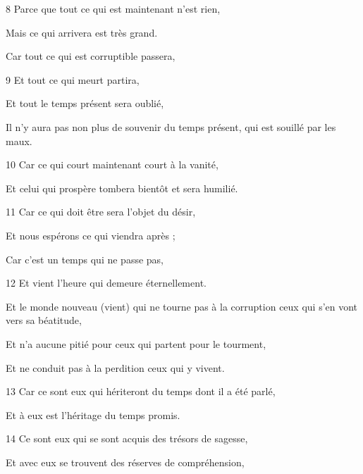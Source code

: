 \par 8 Parce que tout ce qui est maintenant n'est rien,

\par Mais ce qui arrivera est très grand.

\par Car tout ce qui est corruptible passera,

\par 9 Et tout ce qui meurt partira,

\par Et tout le temps présent sera oublié,

\par Il n'y aura pas non plus de souvenir du temps présent, qui est souillé par les maux.

\par 10 Car ce qui court maintenant court à la vanité,

\par Et celui qui prospère tombera bientôt et sera humilié.

\par 11 Car ce qui doit être sera l'objet du désir,

\par Et nous espérons ce qui viendra après ;

\par Car c'est un temps qui ne passe pas,

\par 12 Et vient l'heure qui demeure éternellement.

\par Et le monde nouveau (vient) qui ne tourne pas à la corruption ceux qui s'en vont vers sa béatitude,

\par Et n'a aucune pitié pour ceux qui partent pour le tourment,

\par Et ne conduit pas à la perdition ceux qui y vivent.

\par 13 Car ce sont eux qui hériteront du temps dont il a été parlé,

\par Et à eux est l'héritage du temps promis.

\par 14 Ce sont eux qui se sont acquis des trésors de sagesse,

\par Et avec eux se trouvent des réserves de compréhension,

